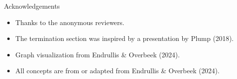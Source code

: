 \documentclass{beamer}
\begin{document}
\begin{frame}{Acknowledgements}
  \begin{itemize}
    \item Thanks to the anonymous reviewers.
    \item The termination section was inspired by a presentation by Plump (2018).
    \item Graph visualization from Endrullis \& Overbeek (2024).
    \item All concepts are from or adapted from Endrullis \& Overbeek (2024).
  \end{itemize}
\end{frame}
\end{document}
